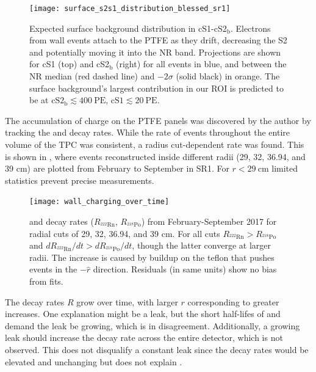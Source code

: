 \begin{figure}
\centering
\texttt{[image: surface\_s2s1\_distribution\_blessed\_sr1]}
\caption[Expected surface background distribution in cS1-cS2$_{\mathrm{b}}$.]{Expected surface background distribution in
cS1-cS2$_{\mathrm{b}}$.  Electrons from wall events attach to the PTFE as they drift,
decreasing the S2 and potentially moving it into the NR band.  Projections are
shown for cS1 (top) and cS2$_{\mathrm{b}}$ (right) for all events in blue, and between the NR median (red dashed line) and
$-2 \sigma$ (solid black) in orange.  The surface background's largest contribution in our ROI is predicted to be at
$\mathrm{cS2_{\mathrm{b}}} \lesssim 400\ \mathrm{PE}$, $\mathrm{cS1} \lesssim 20\ \mathrm{PE}$.}
\label{fig:backgrounds_detector_materials_bands}
\end{figure}

The accumulation of charge on the PTFE panels was discovered by the author by tracking the  and  decay
rates.  While the rate of events throughout the entire volume of the TPC was consistent, a radius cut-dependent rate was found.  This
is shown in , where events reconstructed inside different radii (29, 32, 36.94, and 39 cm) are
plotted from February to September in SR1.  For $r < 29\ \mathrm{cm}$ limited statistics prevent precise measurements.

\begin{figure}
\centering
\texttt{[image: wall\_charging\_over\_time]}
\caption[ and  decay rates ($R_{\mathrm{^{222}Rn}}$, $R_{\mathrm{^{218}Po}}$) from February-September 2017 for
radial cuts of 29, 32, 36.94, and 39 cm.]{ and  decay rates ($R_{\mathrm{^{222}Rn}}$, $R_{\mathrm{^{218}Po}}$) from
February-September 2017 for radial cuts of 29, 32, 36.94, and 39 cm.  For all cuts $R_{\mathrm{^{222}Rn}} > R_{\mathrm{^{218}Po}}$ and
$dR_{\mathrm{^{222}Rn}}/dt > dR_{\mathrm{^{218}Po}}/dt$, though the latter converge at larger radii.  The increase is caused by \electron
buildup on the teflon that pushes events in the $-\hat{r}$ direction.  Residuals (in same units) show no bias from fits.}
\label{fig:backgrounds_wall_charge}
\end{figure}

The decay rates $R$ grow over time, with larger $r$ corresponding to greater increases.  One explanation might be a leak, but the
short half-lifes of  and  demand the leak be growing, which is in disagreement.  Additionally, a growing
leak should increase the decay rate across the entire detector, which is not observed.  This does not disqualify a constant leak since
the decay rates would be elevated and unchanging but does not explain .

